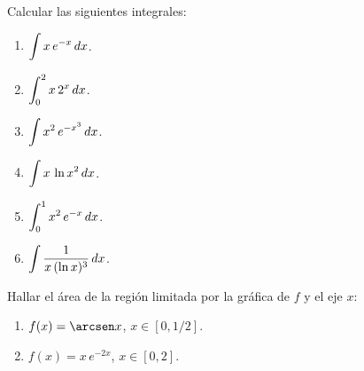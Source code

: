 \item Calcular las siguientes integrales:
\begin{multicols}{2}
  \begin{enumerate}
    \item $\displaystyle \int x\,e^{-x} \,dx$.
    \item $\displaystyle \int_0^2 x \, 2^x  \,dx$.
    \item $\displaystyle \int x^2\, e^{-x^3} \,dx$.
    \item $\displaystyle \int x \, \ln x^2 \,dx$.
    \item $\displaystyle \int_0^1 x^2\, e^{-x} \,dx$.
    \item $\displaystyle \int \frac1{x\, (\ln x)^3} \,dx$.
  \end{enumerate}
  
\end{multicols}
\item Hallar el área de la región limitada por la gráfica de $f$ y el eje $x$:
\begin{multicols}{2}
  \begin{enumerate}
    \item $f(x)=\arcsen x$, $x\in[0,1/2]$.
    \item $f(x)=x\,e^{-2x}$,  $x\in[0,2]$.
  \end{enumerate}
\end{multicols}